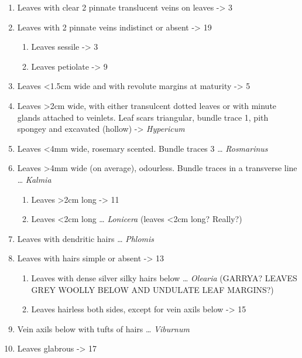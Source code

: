 \documentclass[openany]{book}
\providecommand{\tightlist}{%
  \setlength{\itemsep}{0pt}\setlength{\parskip}{0pt}}
\begin{document}
\begin{enumerate}
\def\labelenumi{\arabic{enumi}.}
\tightlist
\item
  Leaves with clear 2 pinnate translucent veins on leaves
  -\textgreater{} 3
\item
  Leaves with 2 pinnate veins indistinct or absent -\textgreater{} 19

  \begin{enumerate}
  \def\labelenumii{\arabic{enumii}.}
  \setcounter{enumii}{2}
  \tightlist
  \item
    Leaves sessile -\textgreater{} 3
  \item
    Leaves petiolate -\textgreater{} 9
  \end{enumerate}
\item
  Leaves \textless{}1.5cm wide and with revolute margins at maturity
  -\textgreater{} 5
\item
  Leaves \textgreater{}2cm wide, with either transulcent dotted leaves
  or with minute glands attached to veinlets. Leaf scars triangular,
  bundle trace 1, pith spongey and excavated (hollow) -\textgreater{}
  \emph{Hypericum}
\item
  Leaves \textless{}4mm wide, rosemary scented. Bundle traces 3 \ldots{}
  \emph{Rosmarinus}
\item
  Leaves \textgreater{}4mm wide (on average), odourless. Bundle traces
  in a transverse line \ldots{} \emph{Kalmia}

  \begin{enumerate}
  \def\labelenumii{\arabic{enumii}.}
  \setcounter{enumii}{8}
  \tightlist
  \item
    Leaves \textgreater{}2cm long -\textgreater{} 11
  \item
    Leaves \textless{}2cm long \ldots{} \emph{Lonicera} (leaves
    \textless{}2cm long? Really?)
  \end{enumerate}
\item
  Leaves with dendritic hairs \ldots{} \emph{Phlomis}
\item
  Leaves with hairs simple or absent -\textgreater{} 13

  \begin{enumerate}
  \def\labelenumii{\arabic{enumii}.}
  \setcounter{enumii}{12}
  \tightlist
  \item
    Leaves with dense silver silky hairs below \ldots{} \emph{Olearia}
    (GARRYA? LEAVES GREY WOOLLY BELOW AND UNDULATE LEAF MARGINS?)
  \item
    Leaves hairless both sides, except for vein axils below
    -\textgreater{} 15
  \end{enumerate}
\item
  Vein axils below with tufts of hairs \ldots{} \emph{Viburnum}
\item
  Leaves glabrous -\textgreater{} 17


\end{enumerate}
\end{document}
